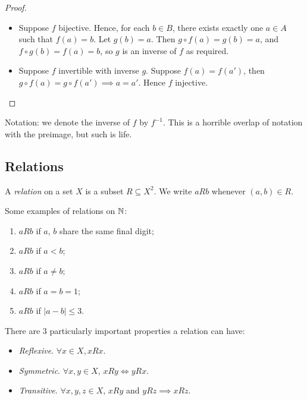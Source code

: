 \documentclass{../../template/note}
\begin{document}
    \begin{proof}
        \begin{itemize}
            \item[\(\impliedby\)] Suppose \(f\) bijective. Hence, for each \(b \in B\), there exists exactly one \(a \in A\) such that \(f(a) = b\). Let \(g(b) = a\). Then \(g \circ f(a) = g(b) = a\), and \(f \circ g(b) = f(a) = b\), so \(g\) is an inverse of \(f\) as required.
            \item[\(\implies\)] Suppose \(f\) invertible with inverse \(g\). Suppose \(f(a) = f(a')\), then \(g \circ f(a) = g \circ f(a') \implies a = a'\). Hence \(f\) injective.    
        \end{itemize}
    \end{proof}
    
    Notation: we denote the inverse of \(f\) by \(f^{-1}\). This is a horrible overlap of notation with the preimage, but such is life.

    \subsection{Relations}
    
    \begin{definition}
        A \emph{relation} on a set \(X\) is a subset \(R \subseteq X^2\). We write \(aRb\) whenever \((a, b) \in R\).
    \end{definition}
    
    \begin{example}
        Some examples of relations on \(\mathbb N\):
        \begin{enumerate}[label=\protect\circled{\arabic*}]
            \item \(aRb\) if \(a\), \(b\) share the same final digit;
            \item \(aRb\) if \(a < b\);
            \item \(aRb\) if \(a \neq b\);
            \item \(aRb\) if \(a = b = 1\);
            \item \(aRb\) if \(|a-b| \leq 3\).
        \end{enumerate}
    \end{example}
    
    \begin{definition}
        There are 3 particularly important properties a relation can have:
        \begin{itemize}
            \item \emph{Reflexive}. \(\forall x \in X, xRx\).
            \item \emph{Symmetric}. \(\forall x, y \in X\), \(xRy \iff yRx\).
            \item \emph{Transitive}. \(\forall x, y, z \in X\), \(xRy\) and \(yRz \implies xRz\).
        \end{itemize}
    \end{definition}
\end{document}
